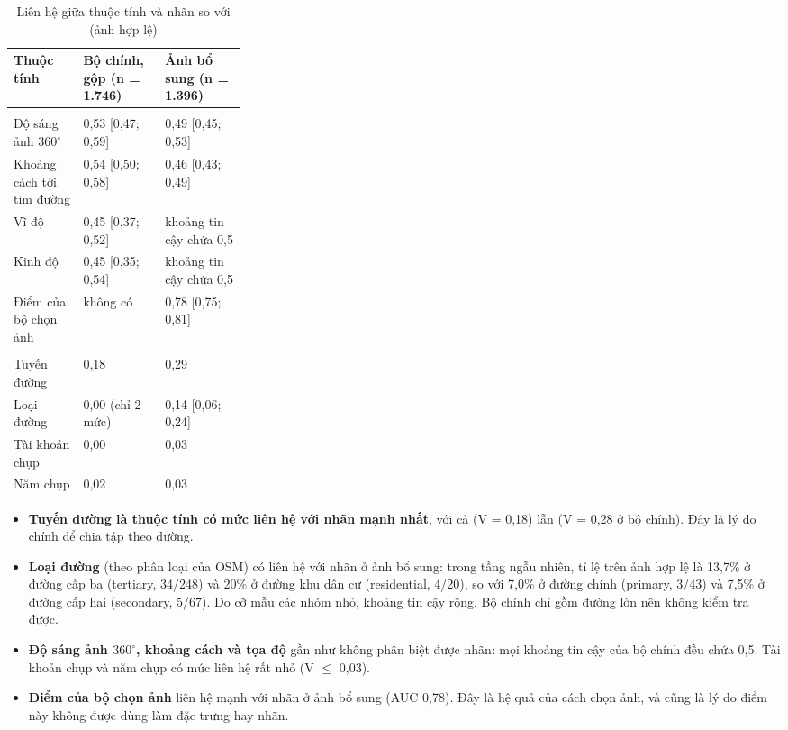 \begin{table}[H]
\centering
\caption{Liên hệ giữa thuộc tính và nhãn  so với  (ảnh hợp lệ)}
\label{tab:assoc}
\begin{tabularx}{\textwidth}{>{\raggedright\arraybackslash}p{0.3\linewidth} L L}
\toprule
\textbf{Thuộc tính} & \textbf{Bộ chính, gộp (n = 1.746)} & \textbf{Ảnh bổ sung (n = 1.396)} \\
\midrule
{} \\
Độ sáng ảnh $360^\circ$ & 0,53 [0,47; 0,59] & 0,49 [0,45; 0,53] \\
Khoảng cách tới tim đường & 0,54 [0,50; 0,58] & 0,46 [0,43; 0,49] \\
Vĩ độ & 0,45 [0,37; 0,52] & khoảng tin cậy chứa 0,5 \\
Kinh độ & 0,45 [0,35; 0,54] & khoảng tin cậy chứa 0,5 \\
Điểm của bộ chọn ảnh & không có & 0,78 [0,75; 0,81] \\
\midrule
{} \\
Tuyến đường & 0,18 & 0,29 \\
Loại đường & 0,00 (chỉ 2 mức) & 0,14 [0,06; 0,24] \\
Tài khoản chụp & 0,00 & 0,03 \\
Năm chụp & 0,02 & 0,03 \\
\bottomrule
\end{tabularx}
\end{table}

\begin{itemize}
  \item \textbf{Tuyến đường là thuộc tính có mức liên hệ với nhãn mạnh nhất}, với cả  (V = 0,18) lẫn  (V = 0,28 ở bộ chính). Đây là lý do chính để chia tập theo đường.
  \item \textbf{Loại đường} (theo phân loại của OSM) có liên hệ với nhãn ở ảnh bổ sung: trong tầng ngẫu nhiên, tỉ lệ  trên ảnh hợp lệ là 13,7\% ở đường cấp ba (tertiary, 34/248) và 20\% ở đường khu dân cư (residential, 4/20), so với 7,0\% ở đường chính (primary, 3/43) và 7,5\% ở đường cấp hai (secondary, 5/67). Do cỡ mẫu các nhóm nhỏ, khoảng tin cậy rộng. Bộ chính chỉ gồm đường lớn nên không kiểm tra được.
  \item \textbf{Độ sáng ảnh $360^\circ$, khoảng cách và tọa độ} gần như không phân biệt được nhãn: mọi khoảng tin cậy của bộ chính đều chứa 0,5. Tài khoản chụp và năm chụp có mức liên hệ rất nhỏ (V $\le$ 0,03).
  \item \textbf{Điểm của bộ chọn ảnh} liên hệ mạnh với nhãn ở ảnh bổ sung (AUC 0,78). Đây là hệ quả của cách chọn ảnh, và cũng là lý do điểm này không được dùng làm đặc trưng hay nhãn.
\end{itemize}

